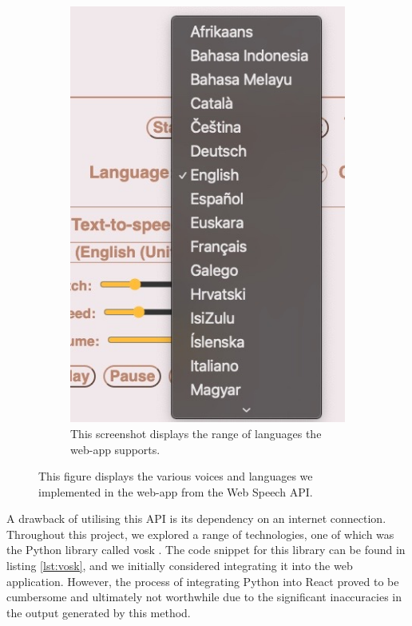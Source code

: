 \documentclass{l4proj}
\begin{document}
\begin{figure}
\begin{subfigure}[b]{0.3\textwidth}
        \includegraphics[width=\textwidth]{dissertation/images/languages.jpeg}
        \caption{This screenshot displays the range of languages the web-app supports.}
        \label{fig:languages}
    \end{subfigure}
    \caption{This figure displays the various voices and languages we implemented in the web-app from the Web Speech API.}
    \label{fig:voices-languages} 
\end{figure}

A drawback of utilising this API is its dependency on an internet connection. Throughout this project, we explored a range of technologies, one of which was the Python library called vosk \citep{PyPI}. The code snippet for this library can be found in listing \ref{lst:vosk}, and we initially considered integrating it into the web application. However, the process of integrating Python into React proved to be cumbersome and ultimately not worthwhile due to the significant inaccuracies in the output generated by this method.
\end{document}
